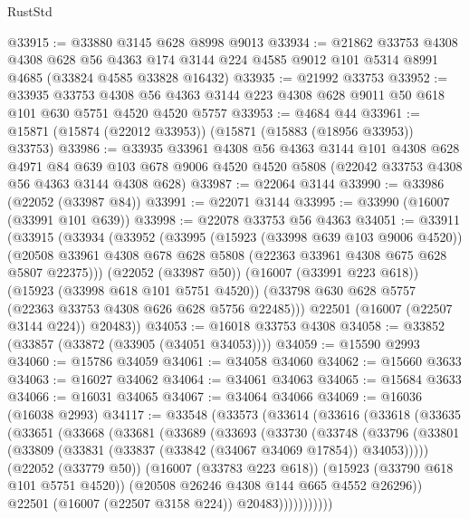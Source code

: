 \begin{lexlean}{RustStd}
\begin{coremodule}
@33915 := @33880 @3145 @628 @8998 @9013
@33934 := @21862
    @33753
    @4308
    @4308
    @628
    @56
    @4363
    @174
    @3144
    @224
    @4585
    @9012
    @101
    @5314
    @8991
    @4685
    (@33824 @4585 @33828 @16432)
@33935 := @21992 @33753
@33952 := @33935
    @33753
    @4308
    @56
    @4363
    @3144
    @223
    @4308
    @628
    @9011
    @50
    @618
    @101
    @630
    @5751
    @4520
    @4520
    @5757
@33953 := @4684 @44
@33961 := @15871 (@15874 (@22012 @33953)) (@15871 (@15883 (@18956 @33953)) @33753)
@33986 := @33935
    @33961
    @4308
    @56
    @4363
    @3144
    @101
    @4308
    @628
    @4971
    @84
    @639
    @103
    @678
    @9006
    @4520
    @4520
    @5808
    (@22042 @33753 @4308 @56 @4363 @3144 @4308 @628)
@33987 := @22064 @3144
@33990 := @33986 (@22052 (@33987 @84))
@33991 := @22071 @3144
@33995 := @33990 (@16007 (@33991 @101 @639))
@33998 := @22078 @33753 @56 @4363
@34051 := @33911
    (@33915
      (@33934
        (@33952
          (@33995
            (@15923 (@33998 @639 @103 @9006 @4520))
            (@20508 @33961 @4308 @678 @628 @5808 (@22363 @33961 @4308 @675 @628 @5807 @22375)))
          (@22052 (@33987 @50))
          (@16007 (@33991 @223 @618))
          (@15923 (@33998 @618 @101 @5751 @4520))
          (@33798 @630 @628 @5757 (@22363 @33753 @4308 @626 @628 @5756 @22485)))
        @22501
        (@16007 (@22507 @3144 @224))
        @20483))
@34053 := @16018 @33753 @4308
@34058 := @33852 (@33857 (@33872 (@33905 (@34051 @34053))))
@34059 := @15590 @2993
@34060 := @15786 @34059
@34061 := @34058 @34060
@34062 := @15660 @3633
@34063 := @16027 @34062
@34064 := @34061 @34063
@34065 := @15684 @3633
@34066 := @16031 @34065
@34067 := @34064 @34066
@34069 := @16036 (@16038 @2993)
@34117 := @33548
    (@33573
      (@33614
        (@33616
          (@33618
            (@33635
              (@33651
                (@33668
                  (@33681
                    (@33689
                      (@33693
                        (@33730
                          (@33748
                            (@33796
                              (@33801
                                (@33809 (@33831 (@33837 (@33842 (@34067 @34069 @17854)) @34053)))))
                            (@22052 (@33779 @50))
                            (@16007 (@33783 @223 @618))
                            (@15923 (@33790 @618 @101 @5751 @4520))
                            (@20508 @26246 @4308 @144 @665 @4552 @26296))
                          @22501
                          (@16007 (@22507 @3158 @224))
                          @20483)))))))))))

\end{coremodule}
\end{lexlean}
